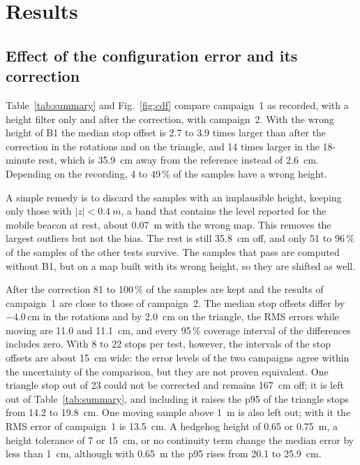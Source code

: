 \documentclass[conference]{IEEEtran}
\begin{document}
\section{Results}
\subsection{Effect of the configuration error and its correction}\label{sec:effect}
Table~\ref{tab:summary} and Fig.~\ref{fig:cdf} compare campaign~1 as recorded, with a height filter
only and after the correction, with campaign~2. With the wrong height of B1 the median stop offset is
2.7 to 3.9 times larger than after the correction in the rotations and on the triangle, and 14 times
larger in the 18-minute rest, which is \SI{35.9}{cm} away from the reference instead of
\SI{2.6}{cm}. Depending on the recording, 4 to 49\,\% of the samples have a wrong height.

A simple remedy is to discard the samples with an implausible height, keeping only those with
$|z|<\SI{0.4}{m}$, a band that contains the level reported for the mobile beacon at rest, about \SI{0.07}{m} with the
wrong map. This removes the largest outliers but not the bias. The rest is still
\SI{35.8}{cm} off, and only 51 to 96\,\% of the samples of the other tests survive. The samples that
pass are computed without B1, but on a map built with its wrong height, so they are shifted as well.

After the correction 81 to 100\,\% of the samples are kept and the results of campaign~1 are close
to those of campaign~2. The median stop offsets differ by $-4.0$\,cm in the
rotations and by \SI{2.0}{cm} on the triangle, the RMS errors while moving are 11.0 and
\SI{11.1}{cm}, and every 95\,\% coverage interval of the differences includes zero. With 8 to 22
stops per test, however, the intervals of the stop offsets are about \SI{15}{cm} wide: the error
levels of the two campaigns agree within the uncertainty of the comparison, but they are not proven equivalent. One triangle
stop out of 23 could not be corrected and remains \SI{167}{cm} off; it is left out of
Table~\ref{tab:summary}, and including it raises the p95 of the triangle stops from 14.2 to
\SI{19.8}{cm}. One moving sample above \SI{1}{m} is also left out; with it the RMS error of campaign~1 is \SI{13.5}{cm}. A hedgehog height of 0.65 or \SI{0.75}{m}, a height tolerance of 7 or
\SI{15}{cm}, or no continuity term change the median error by less than \SI{1}{cm}, although with \SI{0.65}{m} the p95 rises from 20.1 to \SI{25.9}{cm}.
\end{document}
